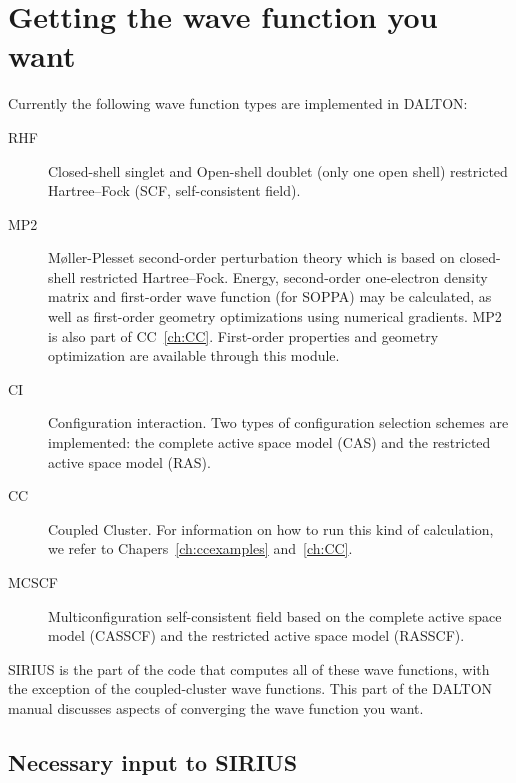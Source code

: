 \chapter{\label{ch:wf-guide}Getting the wave function you want}

Currently the following wave function types are implemented in DALTON:

\begin{description}

\item[RHF] Closed-shell singlet and Open-shell doublet (only one open shell)
restricted Hartree--Fock (SCF, self-consistent
field).

\item[MP2]
M{\o}ller-Plesset second-order perturbation theory which is based on
closed-shell restricted Hartree--Fock.  Energy, second-order one-electron
density matrix and first-order wave function (for SOPPA) may be
calculated, as well as first-order geometry optimizations using
numerical gradients. MP2 is also part of CC~\ref{ch:CC}.
First-order properties and geometry optimization are available through
this module.  

\item[CI] Configuration
interaction. Two types of
configuration selection schemes are implemented: the complete active
space model (CAS) and the restricted active space model (RAS).

\item[CC] Coupled Cluster.
For information on how to run this kind of calculation, we refer to 
Chapers~\ref{ch:ccexamples} and~\ref{ch:CC}.

\item[MCSCF] Multiconfiguration self-consistent field based on
the complete active space model (CASSCF) and
the restricted active space model
(RASSCF).

\end{description}

SIRIUS is the part of the code that computes all of these
wave functions, with the exception of the coupled-cluster wave functions.
This part of the DALTON manual discusses aspects of converging the
wave function you want.

\section{\label{sec:ig_necinp} Necessary input to SIRIUS}

